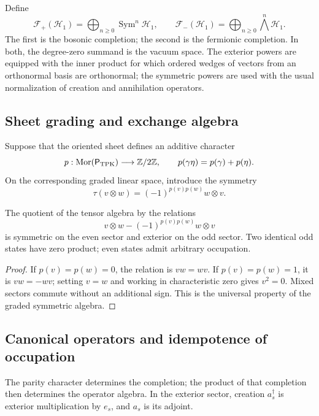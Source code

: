 Define
\[
 \mathcal F_+(\mathcal H_1)=
 \bigoplus_{n\geq0}\operatorname{Sym}^n\mathcal H_1,
 \qquad
 \mathcal F_-(\mathcal H_1)=
 \bigoplus_{n\geq0}\bigwedge^n\mathcal H_1.
\]
The first is the bosonic completion; the second is the fermionic completion. In both,
the degree-zero summand is the vacuum space. The exterior powers
are equipped with the inner product for which ordered wedges of vectors
from an orthonormal basis are orthonormal; the symmetric powers are used
with the usual normalization of creation and annihilation operators.

\subsection{Sheet grading and exchange algebra}
\label{v:rec:completaciones:section:04}

Suppose that the oriented sheet defines an additive character
\[
 p:\operatorname{Mor}(\mathsf P_{\rm TPK})\longrightarrow\mathbb Z/2\mathbb Z,
 \qquad p(\gamma\eta)=p(\gamma)+p(\eta).
\]
On the corresponding graded linear space, introduce the symmetry
\[
 \tau(v\otimes w)=(-1)^{p(v)p(w)}w\otimes v.
\]

\begin{theorem}
\label{v:rec:completaciones:statement:02}
The quotient of the tensor algebra by the relations
\[
 v\otimes w-(-1)^{p(v)p(w)}w\otimes v
\]
is symmetric on the even sector and exterior on the odd sector. Two identical
odd states have zero product; even states admit arbitrary
occupation.
\end{theorem}

\begin{proof}
If \(p(v)=p(w)=0\), the relation is \(vw=wv\). If
\(p(v)=p(w)=1\), it is \(vw=-wv\); setting \(v=w\) and working in
characteristic zero gives \(v^2=0\). Mixed sectors commute without
an additional sign. This is the universal property of the graded symmetric
algebra.
\end{proof}

\subsection{Canonical operators and idempotence of occupation}
\label{v:pauli:car-construccion}

The parity character determines the completion; the product of that
completion then determines the operator algebra. In the
exterior sector, creation \(a_s^\dagger\) is exterior multiplication by
\(e_s\), and \(a_s\) is its adjoint.

